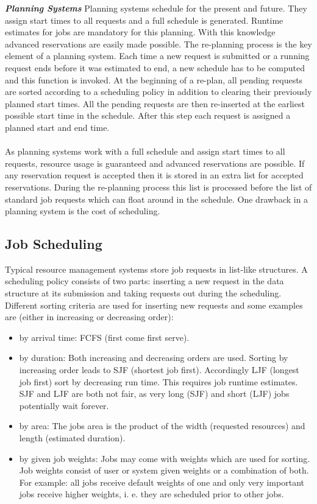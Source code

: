 \textbf{\textit{Planning Systems }}Planning systems schedule for the present and future. They assign start times to all requests and a full schedule is generated. Runtime estimates for jobs are mandatory for this planning. With this knowledge advanced reservations are easily made possible. The re-planning process is the key element of a planning system. Each time a new request is submitted or a running request ends before it was estimated to end, a new schedule has to be computed and this function is invoked. At the beginning of a re-plan, all pending requests are sorted according to a scheduling policy in addition to clearing their previously planned start times. All the pending requests are then re-inserted at the earliest possible start time in the schedule. After this step each request is assigned a planned start and end time.\\ \\
As planning systems work with a full schedule and assign start times to all requests, resource usage is guaranteed and advanced reservations are possible. If any reservation request is accepted then it is stored in an extra list for accepted reservations. During the re-planning process this list is processed before the list of standard job requests which can float around in the schedule. One drawback in a planning system is the cost of scheduling.
\subsection{Job Scheduling}
Typical resource management systems store job requests in list-like structures. A scheduling policy consists of two parts: inserting a new request in the data structure at its submission and taking requests out during the scheduling. Different sorting criteria are used for inserting new requests and some examples are (either in increasing or decreasing order)\cite{tsafrir}:
\begin{itemize}
\item by arrival time: FCFS (first come first serve). 
\item by duration: Both increasing and decreasing orders are used. Sorting by increasing order leads to SJF (shortest job first). Accordingly LJF (longest job first) sort by decreasing run time. This requires job runtime estimates. SJF and LJF are both not fair, as very long (SJF) and short (LJF) jobs potentially wait forever.
\item by area: The jobs area is the product of the width (requested resources) and length (estimated duration). 
\item by given job weights: Jobs may come with weights which are used for sorting. Job weights consist of user or system given weights or a combination of both. For example: all jobs receive default weights of one and only very important jobs receive higher weights, i. e. they are scheduled prior to other jobs.
\end{itemize}

